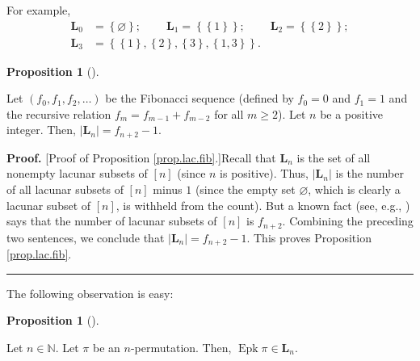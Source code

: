 \documentclass[numbers=enddot,12pt,final,onecolumn,notitlepage]{scrartcl}%
\theoremstyle{definition}
\newtheorem{prop}[theo]{Proposition}
\newenvironment{proposition}[1][]
{\begin{prop}[#1]\begin{leftbar}}
{\end{leftbar}\end{prop}}
\newenvironment{proof}[1][Proof]{\noindent\textbf{#1.} }{\ \rule{0.5em}{0.5em}}
\begin{document}
For example,%
\begin{align*}
\mathbf{L}_{0}  &  =\left\{  \varnothing\right\}
;\ \ \ \ \ \ \ \ \ \ \mathbf{L}_{1}=\left\{  \left\{  1\right\}  \right\}
;\ \ \ \ \ \ \ \ \ \ \mathbf{L}_{2}=\left\{  \left\{  2\right\}  \right\}  ;\\
\mathbf{L}_{3}  &  =\left\{  \left\{  1\right\}  ,\left\{  2\right\}
,\left\{  3\right\}  ,\left\{  1,3\right\}  \right\}  .
\end{align*}


\begin{proposition}
\label{prop.lac.fib}Let $\left(  f_{0},f_{1},f_{2},\ldots\right)  $ be the
Fibonacci sequence (defined by $f_{0}=0$ and $f_{1}=1$ and the recursive
relation $f_{m}=f_{m-1}+f_{m-2}$ for all $m\geq2$). Let $n$ be a positive
integer. Then, $\left\vert \mathbf{L}_{n}\right\vert =f_{n+2}-1$.
\end{proposition}

\begin{proof}
[Proof of Proposition \ref{prop.lac.fib}.]Recall that $\mathbf{L}_{n}$ is the
set of all nonempty lacunar subsets of $\left[  n\right]  $ (since $n$ is
positive). Thus, $\left\vert \mathbf{L}_{n}\right\vert $ is the number of all
lacunar subsets of $\left[  n\right]  $ minus $1$ (since the empty set
$\varnothing$, which is clearly a lacunar subset of $\left[  n\right]  $, is
withheld from the count). But a known fact (see, e.g., \cite[Exercise 1.35
\textbf{a.}]{Stanley-EC1}) says that the number of lacunar subsets of $\left[
n\right]  $ is $f_{n+2}$. Combining the preceding two sentences, we conclude
that $\left\vert \mathbf{L}_{n}\right\vert =f_{n+2}-1$. This proves
Proposition \ref{prop.lac.fib}.
\end{proof}

The following observation is easy:

\begin{proposition}
\label{prop.Epk-lac}Let $n\in\mathbb{N}$. Let $\pi$ be an $n$-permutation.
Then, $\operatorname*{Epk}\pi\in\mathbf{L}_{n}$.
\end{proposition}
\end{document}
